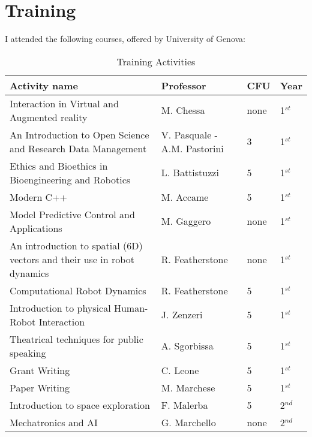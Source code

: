 \newpage
\section{Training}
I attended the following courses, offered by University of Genova:
\begin{table}[H]
	\begin{center}
		\renewcommand{\arraystretch}{1.3} %
		\setlength{\tabcolsep}{8pt} %
		\begin{tabular}{P{10cm} P{3cm} P{0.8cm} P{0.8cm}}
			\toprule
			\textbf{Activity name} & \textbf{Professor} & \textbf{CFU} & \textbf{Year} \\ 
			\midrule
			Interaction in Virtual and Augmented reality & M. Chessa & none & 1$^{st}$ \\
			\midrule
			An Introduction to Open Science and Research Data Management & V. Pasquale - A.M. Pastorini & 3 & 1$^{st}$ \\ 
			\midrule
			Ethics and Bioethics in Bioengineering and Robotics & L. Battistuzzi & 5 & 1$^{st}$ \\
			\midrule
			Modern C++ & M. Accame & 5 & 1$^{st}$ \\
			\midrule
			Model Predictive Control and Applications & M. Gaggero & none & 1$^{st}$ \\
			\midrule
			An introduction to spatial (6D) vectors and their use in robot dynamics & R. Featherstone & none & 1$^{st}$ \\ 
			\midrule
			Computational Robot Dynamics & R. Featherstone & 5 & 1$^{st}$ \\ 
			\midrule
			Introduction to physical Human-Robot Interaction & J. Zenzeri & 5 & 1$^{st}$ \\	
			\midrule
			Theatrical techniques for public speaking & A. Sgorbissa & 5 & 1$^{st}$ \\ 
			\bottomrule
			Grant Writing & C. Leone & 5 & 1$^{st}$ \\ 
			\midrule
			Paper Writing & M. Marchese & 5 & 1$^{st}$ \\ 
			\midrule 
			Introduction to space exploration & F. Malerba & 5 & 2$^{nd}$ \\
			\midrule
			Mechatronics and AI & G. Marchello & none & 2$^{nd}$\\
			\bottomrule
		\end{tabular}
	\end{center}
	\caption{Training Activities}
\end{table}

